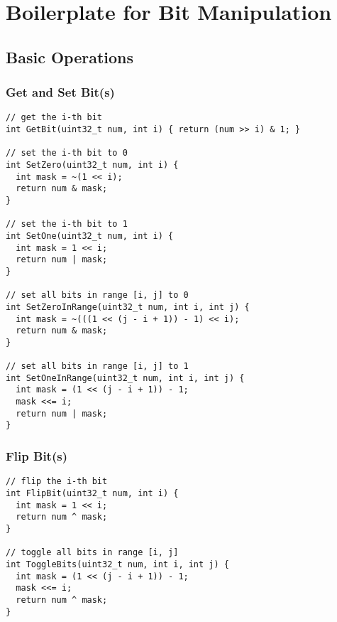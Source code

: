 \chapter{Boilerplate for Bit Manipulation}
\section{Basic Operations}
\subsection{Get and Set Bit(s)}
\begin{lstlisting}
// get the i-th bit
int GetBit(uint32_t num, int i) { return (num >> i) & 1; }

// set the i-th bit to 0
int SetZero(uint32_t num, int i) {
  int mask = ~(1 << i);
  return num & mask;
}

// set the i-th bit to 1
int SetOne(uint32_t num, int i) {
  int mask = 1 << i;
  return num | mask;
}

// set all bits in range [i, j] to 0
int SetZeroInRange(uint32_t num, int i, int j) {
  int mask = ~(((1 << (j - i + 1)) - 1) << i);
  return num & mask;
}

// set all bits in range [i, j] to 1
int SetOneInRange(uint32_t num, int i, int j) {
  int mask = (1 << (j - i + 1)) - 1;
  mask <<= i;
  return num | mask;
}
\end{lstlisting}

\subsection{Flip Bit(s)}
\begin{lstlisting}
// flip the i-th bit
int FlipBit(uint32_t num, int i) {
  int mask = 1 << i;
  return num ^ mask;
}

// toggle all bits in range [i, j]
int ToggleBits(uint32_t num, int i, int j) {
  int mask = (1 << (j - i + 1)) - 1;
  mask <<= i;
  return num ^ mask;
}
\end{lstlisting}

